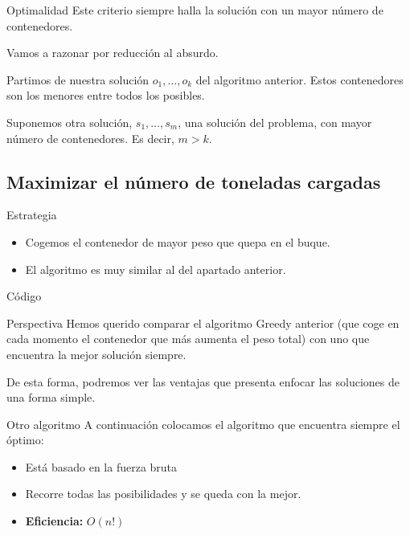\begin{frame}{Optimalidad}
Este criterio siempre halla la solución con un mayor número de contenedores.

Vamos a razonar por reducción al absurdo.

\vspace{1cm}
\pause
Partimos de nuestra solución  $o_1, \dots, o_k$ del algoritmo anterior. Estos contenedores son los menores entre todos los posibles.

Suponemos otra solución, $s_1, \dots, s_m$, una solución del problema, con mayor número de contenedores. Es decir, $m > k$.

\end{frame}

\subsection{Maximizar el número de toneladas cargadas}

\begin{frame}{Estrategia}
\begin{itemize}
  \item Cogemos el contenedor de mayor peso que quepa en el buque.
  \item El algoritmo es muy similar al del apartado anterior.
\end{itemize}
\end{frame}

\begin{frame}[fragile]{Código}

\end{frame}

\begin{frame}{Perspectiva}
	Hemos querido comparar el algoritmo Greedy anterior (que coge en cada momento el contenedor que más aumenta el peso total) con uno que encuentra la mejor solución siempre.
	\vspace{1cm}
	
	De esta forma, podremos ver las ventajas que presenta enfocar las soluciones de una forma simple.
\end{frame}

\begin{frame}{Otro algoritmo}
	A continuación colocamos el algoritmo que encuentra siempre el óptimo:
	
	\begin{itemize}
		\item Está basado en la fuerza bruta
		\item Recorre todas las posibilidades y se queda con la mejor.
		\item \textbf{Eficiencia:} $O(n!)$
	\end{itemize}	
\end{frame}

